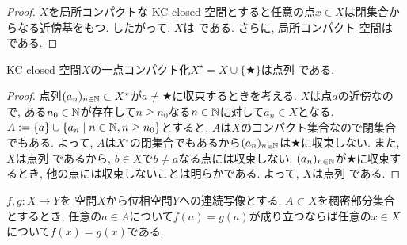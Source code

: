 \documentclass[uplatex, dvipdfmx, a4paper, 12pt, class=jsbook, crop=false]{standalone}
\begin{document}
\begin{proof}
	$ X $を局所コンパクトな KC-closed 空間とすると任意の点$ x \in X $は閉集合からなる近傍基をもつ. したがって, $ X $は  である. さらに, 局所コンパクト \Hausdorff 空間は  である.
\end{proof}

\begin{proposition}
	KC-closed 空間$ X $の一点コンパクト化$ X^\star = X \cup \{\bigstar\} $は点列 \Hausdorff である.
\end{proposition}

\begin{proof}
	点列$ (a_n)_{n \in \mathbb{N}} \subset X^\star $が$ a \neq \bigstar $に収束するときを考える. $ X $は点$ a $の近傍なので, ある$ n_0 \in \mathbb{N} $が存在して$ n \geq n_0 $なる$ n \in \mathbb{N} $に対して$ a_n \in X $となる. $ A \defeq \{a\} \cup \setcomp{a_n}{n \in \N, n \geq n_0} $とすると, $ A $は$ X $のコンパクト集合なので閉集合でもある. よって, $ A $は$ X^\star $の閉集合でもあるから$ (a_n)_{n \in \mathbb{N}} $は$ \bigstar $に収束しない. また, $ X $は点列 \Hausdorff であるから, $ b \in X $で$ b \neq a $なる点には収束しない. $ (a_n)_{n \in \mathbb{N}} $が$ \bigstar $に収束するとき, 他の点には収束しないことは明らかである. よって, $ X $は点列 \Hausdorff である.
\end{proof}

\begin{proposition}
	\label{prop:Continuous maps on a dense subset in a Hausdorff space}
	$ f, g \colon X \to Y $を \Hausdorff 空間$ X $から位相空間$ Y $への連続写像とする. $ A \subset X $を稠密部分集合とするとき, 任意の$ a \in A $について$ f(a) = g(a) $が成り立つならば任意の$ x \in X $について$ f(x) = g(x) $である.
\end{proposition}
\end{document}
